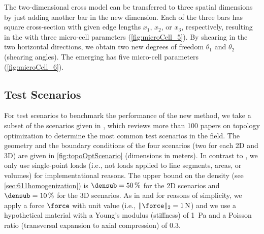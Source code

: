 The two-dimensional cross model can be transferred to three
spatial dimensions by just adding another bar in the new dimension.
Each of the three bars has square cross-section with given edge lengths
$x_1$, $x_2$, or $x_3$, respectively,
resulting in the  with three micro-cell parameters
(\cref{fig:microCell_5}).
By shearing in the two horizontal directions,
we obtain two new degrees of freedom $\theta_1$ and $\theta_2$
(shearing angles).
The emerging  has five micro-cell parameters
(\cref{fig:microCell_6}).



\subsection{Test Scenarios}
\label{sec:632scenarios}


For test scenarios to benchmark the performance of the new method,
we take a subset of the scenarios given in \cite{Valdez17Topology},
which reviews more than 100 papers on topology optimization
to determine the most common test scenarios in the field.
The geometry and the boundary conditions of the
four scenarios (two for each 2D and 3D)
are given in \cref{fig:topoOptScenario} (dimensions in meters).
In contrast to \cite{Valdez17Topology},
we only use single-point loads
(i.e., not loads applied to line segments, areas, or volumes)
for implementational reasons.
The upper bound on the density (see \cref{sec:611homogenization})
is $\densub = \SI{50}{\percent}$ for the 2D scenarios and
$\densub = \SI{10}{\percent}$ for the 3D scenarios.
As in \cite{Sigmund01Line} and for reasons of simplicity,
we apply a force $\force$ with unit value
(i.e., $\norm[2]{\force} = \SI{1}{\newton}$)
and we use a hypothetical material with
a Young's modulus (stiffness) of \SI{1}{\pascal} and
a Poisson ratio (transversal expansion to axial compression) of $0.3$.

